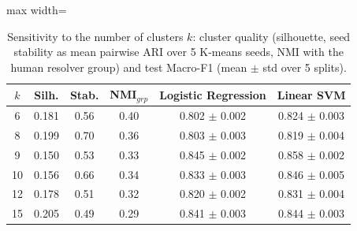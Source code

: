 \begin{table}[!t]
\centering
\caption{Sensitivity to the number of clusters $k$: cluster quality (silhouette, seed stability as mean pairwise ARI over 5 K-means seeds, NMI with the human resolver group) and test Macro-F1 (mean $\pm$ std over 5 splits).}
\label{tab:ksens}
\footnotesize
\begin{adjustbox}{max width=\columnwidth}
\begin{tabular}{cccccc}
\hline
$k$ & Silh. & Stab. & NMI$_{grp}$ & Logistic Regression & Linear SVM \\
\hline
6 & 0.181 & 0.56 & 0.40 & 0.802 $\pm$ 0.002 & 0.824 $\pm$ 0.003 \\
8 & 0.199 & 0.70 & 0.36 & 0.803 $\pm$ 0.003 & 0.819 $\pm$ 0.004 \\
9 & 0.150 & 0.53 & 0.33 & 0.845 $\pm$ 0.002 & 0.858 $\pm$ 0.002 \\
10 & 0.156 & 0.66 & 0.34 & 0.833 $\pm$ 0.003 & 0.846 $\pm$ 0.005 \\
12 & 0.178 & 0.51 & 0.32 & 0.820 $\pm$ 0.002 & 0.831 $\pm$ 0.004 \\
15 & 0.205 & 0.49 & 0.29 & 0.841 $\pm$ 0.003 & 0.844 $\pm$ 0.003 \\
\hline
\end{tabular}
\end{adjustbox}
\end{table}
